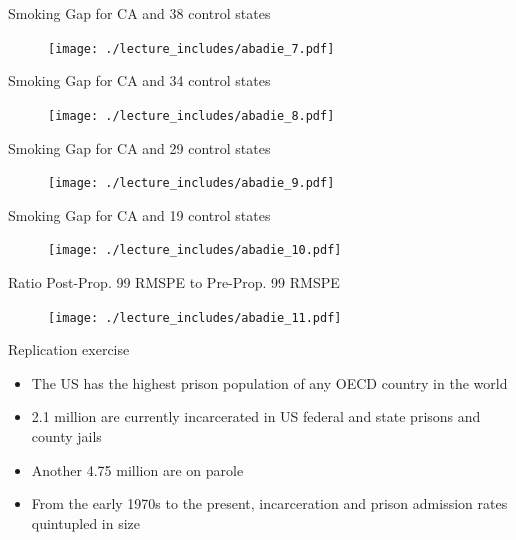 \documentclass{beamer}
\begin{document}
\begin{frame}{Smoking Gap for CA and 38 control states}
	
	\begin{figure}
	\texttt{[image: ./lecture\_includes/abadie\_7.pdf]}
	\end{figure}
\end{frame}

\begin{frame}{Smoking Gap for CA and 34 control states}
	
	\begin{figure}
	\texttt{[image: ./lecture\_includes/abadie\_8.pdf]}
	\end{figure}
\end{frame}

\begin{frame}{Smoking Gap for CA and 29 control states}
	
	\begin{figure}
	\texttt{[image: ./lecture\_includes/abadie\_9.pdf]}
	\end{figure}
\end{frame}

\begin{frame}{Smoking Gap for CA and 19 control states}
	
	\begin{figure}
	\texttt{[image: ./lecture\_includes/abadie\_10.pdf]}
	\end{figure}
\end{frame}

\begin{frame}{Ratio Post-Prop. 99 RMSPE to Pre-Prop. 99 RMSPE}

	\begin{figure}
	\texttt{[image: ./lecture\_includes/abadie\_11.pdf]}
	\end{figure}
\end{frame}




\begin{frame}{Replication exercise}
	
	\begin{itemize}
	\item The US has the highest prison population of any OECD country in the world 
	\item 2.1 million are currently incarcerated in US federal and state prisons and county jails
	\item Another 4.75 million are on parole
	\item From the early 1970s to the present, incarceration and prison admission rates quintupled in size
	\end{itemize}
\end{frame}
\end{document}
